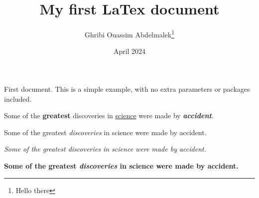 \documentclass[12pt, a4paper]{article}
\title{My first LaTex document}
\author{Ghribi Ouassim Abdelmalek\thanks{Hello there}}
\date{April 2024}
\begin{document}
\maketitle
First document. This is a simple example, with no
extra parameters or packages included.

Some of the \textbf{greatest}
discoveries in \underline{science}
were made by \textbf{\textit{accident}}.

Some of the greatest \emph{discoveries} in science
were made by accident.

\textit{Some of the greatest \emph{discoveries}
    in science were made by accident.}

\textbf{Some of the greatest \emph{discoveries}
    in science were made by accident.}
\end{document}
